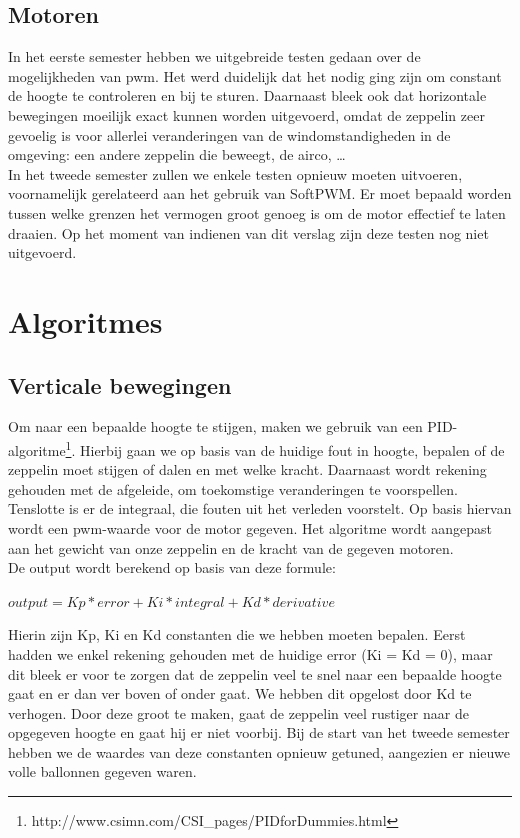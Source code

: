 \documentclass[tt]{penoverslag}
\begin{document}
\subsection{Motoren}
In het eerste semester hebben we uitgebreide testen gedaan over de mogelijkheden van pwm. Het werd duidelijk dat het nodig ging zijn om constant de hoogte te controleren en bij te sturen. Daarnaast bleek ook dat horizontale bewegingen moeilijk exact kunnen worden uitgevoerd, omdat de zeppelin zeer gevoelig is voor allerlei veranderingen van de windomstandigheden in de omgeving: een andere zeppelin die beweegt, de airco, \ldots \\

In het tweede semester zullen we enkele testen opnieuw moeten uitvoeren, voornamelijk gerelateerd aan het gebruik van SoftPWM. Er moet bepaald worden tussen welke grenzen het vermogen groot genoeg is om de motor effectief te laten draaien. Op het moment van indienen van dit verslag zijn deze testen nog niet uitgevoerd.

\section{Algoritmes}
\subsection{Verticale bewegingen}
Om naar een bepaalde hoogte te stijgen, maken we gebruik van een PID-algoritme\footnote{http://www.csimn.com/CSI\_pages/PIDforDummies.html}. Hierbij gaan we op basis van de huidige fout in hoogte, bepalen of de zeppelin moet stijgen of dalen en met welke kracht. Daarnaast wordt rekening gehouden met de afgeleide, om toekomstige veranderingen te voorspellen. Tenslotte is er de integraal, die fouten uit het verleden voorstelt. Op basis hiervan wordt een pwm-waarde voor de motor gegeven. Het algoritme wordt aangepast aan het gewicht van onze zeppelin en de kracht van de gegeven motoren. \\
De output wordt berekend op basis van deze formule:

\begin{center}
$output = Kp*error + Ki*integral + Kd*derivative$\\
\end{center}

Hierin zijn Kp, Ki en Kd constanten die we hebben moeten bepalen. Eerst hadden we enkel rekening gehouden met de huidige error (Ki = Kd = 0), maar dit bleek er voor te zorgen dat de zeppelin veel te snel naar een bepaalde hoogte gaat en er dan ver boven of onder gaat. We hebben dit opgelost door Kd te verhogen. Door deze groot te maken, gaat de zeppelin veel rustiger naar de opgegeven hoogte en gaat hij er niet voorbij. Bij de start van het tweede semester hebben we de waardes van deze constanten opnieuw getuned, aangezien er nieuwe volle ballonnen gegeven waren. \\
\end{document}
